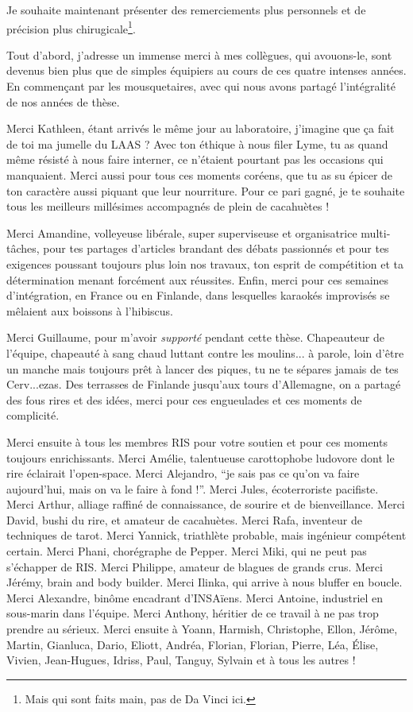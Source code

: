 \documentclass[english,a4paper,11pt,twoside]{StyleThese}
\begin{document}
\bigskip
Je souhaite maintenant présenter des remerciements plus personnels et de précision plus chirugicale\footnote{Mais qui sont faits main, pas de Da Vinci ici.}.

Tout d'abord, j'adresse un immense merci à mes collègues, qui avouons-le, sont devenus bien plus que de simples équipiers au cours de ces quatre intenses années. En commençant par les mousquetaires, avec qui nous avons partagé l'intégralité de nos années de thèse.

Merci Kathleen, étant arrivés le même jour au laboratoire, j'imagine que ça fait de toi ma jumelle du LAAS ? Avec ton éthique à nous filer Lyme, tu as quand même résisté à nous faire interner, ce n'étaient pourtant pas les occasions qui manquaient. Merci aussi pour tous ces moments coréens, que tu as su épicer de ton caractère aussi piquant que leur nourriture. Pour ce pari gagné, je te souhaite tous les meilleurs millésimes accompagnés de plein de cacahuètes !

Merci Amandine, volleyeuse libérale, super superviseuse et organisatrice multi-tâches, pour tes partages d'articles brandant des débats passionnés et pour tes exigences poussant toujours plus loin nos travaux, ton esprit de compétition et ta détermination menant forcément aux réussites. Enfin, merci pour ces semaines d'intégration, en France ou en Finlande, dans lesquelles karaokés improvisés se mêlaient aux boissons à l'hibiscus.

Merci Guillaume, pour m'avoir \textit{supporté} pendant cette thèse. Chapeauteur de l'équipe, chapeauté à sang chaud luttant contre les moulins... à parole, loin d'être un manche mais toujours prêt à lancer des piques, tu ne te sépares jamais de tes Cerv...ezas. Des terrasses de Finlande jusqu'aux tours d'Allemagne, on a partagé des fous rires et des idées, merci pour ces engueulades et ces moments de complicité.

\smallskip

Merci ensuite à tous les membres RIS pour votre soutien et pour ces moments toujours enrichissants. Merci Amélie, talentueuse carottophobe ludovore dont le rire éclairait l'open-space. Merci Alejandro, ``je sais pas ce qu'on va faire aujourd'hui, mais on va le faire à fond !''. Merci Jules, écoterroriste pacifiste. Merci Arthur, alliage raffiné de connaissance, de sourire et de bienveillance. Merci David, bushi du rire, et amateur de cacahuètes. Merci Rafa, inventeur de techniques de tarot. Merci Yannick, triathlète probable, mais ingénieur compétent certain. Merci Phani, chorégraphe de Pepper. Merci Miki, qui ne peut pas s'échapper de RIS. Merci Philippe, amateur de blagues de grands crus. Merci Jérémy, brain and body builder. Merci Ilinka, qui arrive à nous bluffer en boucle. Merci Alexandre, binôme encadrant d'INSAïens. Merci Antoine, industriel en sous-marin dans l'équipe. Merci Anthony, héritier de ce travail à ne pas trop prendre au sérieux.
Merci ensuite à Yoann, Harmish, Christophe, Ellon, Jérôme, Martin, Gianluca, Dario, Eliott, Andréa, Florian, Florian, Pierre, Léa, Élise, Vivien, Jean-Hugues, Idriss, Paul, Tanguy, Sylvain et à tous les autres !
\medskip
\end{document}
